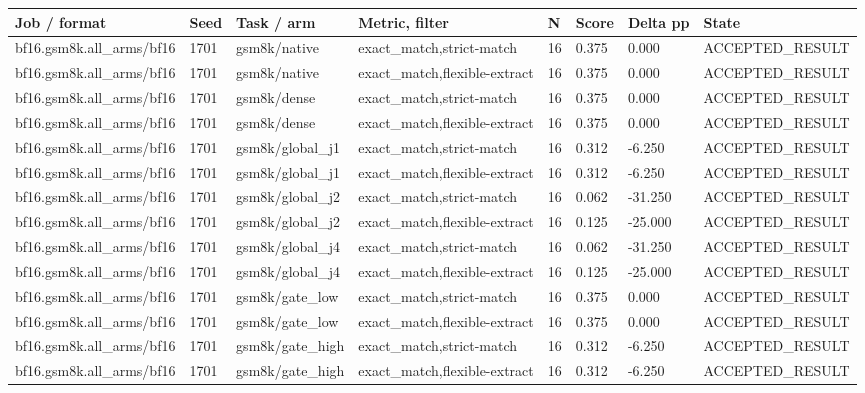 \begin{tabular}{llllllll}
\hline
Job / format & Seed & Task / arm & Metric, filter & N & Score & Delta pp & State \\
\hline
bf16.gsm8k.all\_arms/bf16 & 1701 & gsm8k/native & exact\_match,strict-match & 16 & 0.375 & 0.000 & ACCEPTED\_RESULT \\
bf16.gsm8k.all\_arms/bf16 & 1701 & gsm8k/native & exact\_match,flexible-extract & 16 & 0.375 & 0.000 & ACCEPTED\_RESULT \\
bf16.gsm8k.all\_arms/bf16 & 1701 & gsm8k/dense & exact\_match,strict-match & 16 & 0.375 & 0.000 & ACCEPTED\_RESULT \\
bf16.gsm8k.all\_arms/bf16 & 1701 & gsm8k/dense & exact\_match,flexible-extract & 16 & 0.375 & 0.000 & ACCEPTED\_RESULT \\
bf16.gsm8k.all\_arms/bf16 & 1701 & gsm8k/global\_j1 & exact\_match,strict-match & 16 & 0.312 & -6.250 & ACCEPTED\_RESULT \\
bf16.gsm8k.all\_arms/bf16 & 1701 & gsm8k/global\_j1 & exact\_match,flexible-extract & 16 & 0.312 & -6.250 & ACCEPTED\_RESULT \\
bf16.gsm8k.all\_arms/bf16 & 1701 & gsm8k/global\_j2 & exact\_match,strict-match & 16 & 0.062 & -31.250 & ACCEPTED\_RESULT \\
bf16.gsm8k.all\_arms/bf16 & 1701 & gsm8k/global\_j2 & exact\_match,flexible-extract & 16 & 0.125 & -25.000 & ACCEPTED\_RESULT \\
bf16.gsm8k.all\_arms/bf16 & 1701 & gsm8k/global\_j4 & exact\_match,strict-match & 16 & 0.062 & -31.250 & ACCEPTED\_RESULT \\
bf16.gsm8k.all\_arms/bf16 & 1701 & gsm8k/global\_j4 & exact\_match,flexible-extract & 16 & 0.125 & -25.000 & ACCEPTED\_RESULT \\
bf16.gsm8k.all\_arms/bf16 & 1701 & gsm8k/gate\_low & exact\_match,strict-match & 16 & 0.375 & 0.000 & ACCEPTED\_RESULT \\
bf16.gsm8k.all\_arms/bf16 & 1701 & gsm8k/gate\_low & exact\_match,flexible-extract & 16 & 0.375 & 0.000 & ACCEPTED\_RESULT \\
bf16.gsm8k.all\_arms/bf16 & 1701 & gsm8k/gate\_high & exact\_match,strict-match & 16 & 0.312 & -6.250 & ACCEPTED\_RESULT \\
bf16.gsm8k.all\_arms/bf16 & 1701 & gsm8k/gate\_high & exact\_match,flexible-extract & 16 & 0.312 & -6.250 & ACCEPTED\_RESULT \\

\end{tabular}
